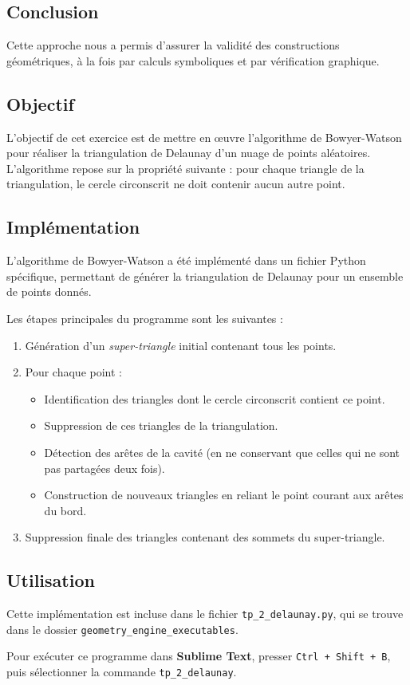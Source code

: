 \documentclass[a4paper,12pt]{article}
\begin{document}
\subsection*{Conclusion}

Cette approche nous a permis d’assurer la validité des constructions géométriques, à la fois par calculs symboliques et par vérification graphique.



\subsection*{Objectif}

L'objectif de cet exercice est de mettre en œuvre l'algorithme de Bowyer-Watson pour réaliser la triangulation de Delaunay d’un nuage de points aléatoires. L'algorithme repose sur la propriété suivante : pour chaque triangle de la triangulation, le cercle circonscrit ne doit contenir aucun autre point.

\newpage

\subsection*{Implémentation}

L'algorithme de Bowyer-Watson a été implémenté dans un fichier Python spécifique, permettant de générer la triangulation de Delaunay pour un ensemble de points donnés. 

Les étapes principales du programme sont les suivantes :

\begin{enumerate}
    \item Génération d’un \textit{super-triangle} initial contenant tous les points.
    \item Pour chaque point :
    \begin{itemize}
        \item Identification des triangles dont le cercle circonscrit contient ce point.
        \item Suppression de ces triangles de la triangulation.
        \item Détection des arêtes de la cavité (en ne conservant que celles qui ne sont pas partagées deux fois).
        \item Construction de nouveaux triangles en reliant le point courant aux arêtes du bord.
    \end{itemize}
    \item Suppression finale des triangles contenant des sommets du super-triangle.
\end{enumerate}

\subsection*{Utilisation}

Cette implémentation est incluse dans le fichier \texttt{tp\_2\_delaunay.py}, qui se trouve dans le dossier \texttt{geometry\_engine\_executables}.

Pour exécuter ce programme dans \textbf{Sublime Text}, presser \texttt{Ctrl + Shift + B}, puis sélectionner la commande \texttt{tp\_2\_delaunay}.
\end{document}
